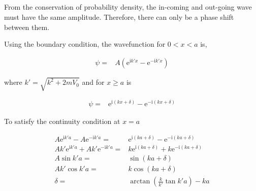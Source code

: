 \documentclass[10pt,fleqn]{article}
\newcommand{\ue}{\mathrm{e}}
\newcommand{\ui}{\mathrm{i}}
\newcommand{\eqar}[1]
{
  \begin{align*}
    #1
  \end{align*}
}
\newcommand{\paren}[1]{{\left({#1}\right)}}
\begin{document}
\subsection{}
From the conservation of probability density,
the in-coming and out-going wave must have the same amplitude.
Therefore, there can only be a phase shift between them.

Using the boundary condition, the wavefunction for $0 < x < a$ is,
\eqar{
  \psi=&A\paren{\ue^{\ui k'x}-\ue^{-\ui k'x}}
}
where $k'=\sqrt{k^2+2mV_0}$ and for $x \geqslant a$ is
\eqar{
  \psi=&\ue^{\ui\paren{kx+\delta}}-\ue^{-\ui\paren{kx+\delta}}
}
To satisfy the continuity condition at $x=a$
\eqar{
  A\ue^{\ui k'a}-A\ue^{-\ui k'a}=&\ue^{\ui\paren{ka+\delta}}-\ue^{-\ui\paren{ka+\delta}}\\
  Ak'\ue^{\ui k'a}+Ak'\ue^{-\ui k'a}=&k\ue^{\ui\paren{ka+\delta}}+k\ue^{-\ui\paren{ka+\delta}}\\
  A\sin k'a=&\sin\paren{ka+\delta}\\
  Ak'\cos k'a=&k\cos\paren{ka+\delta}\\
  \delta=&\arctan\paren{\frac{k}{k'}\tan k'a}-ka
}
\section{}
\section{}
\end{document}
